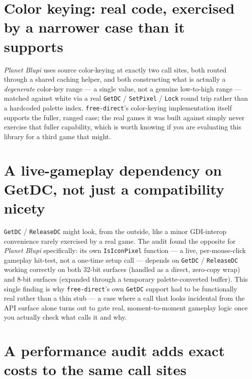 \section{Color keying: real code, exercised by a narrower case than it supports}

\emph{Planet Blupi} uses source color-keying at exactly two call sites, both routed through a
shared caching helper, and both constructing what is actually a \emph{degenerate} color-key
range --- a single value, not a genuine low-to-high range --- matched against white via a
real \texttt{GetDC} / \texttt{SetPixel} / \texttt{Lock} round trip rather than a hardcoded palette
index. \texttt{free-direct}'s color-keying implementation itself supports the fuller, ranged
case; the real games it was built against simply never exercise that fuller capability, which
is worth knowing if you are evaluating this library for a third game that might.

\section{A live-gameplay dependency on GetDC, not just a compatibility nicety}

\texttt{GetDC} / \texttt{ReleaseDC} might look, from the outside, like a minor GDI-interop
convenience rarely exercised by a real game. The audit found the opposite for
\emph{Planet Blupi} specifically: its own \texttt{IsIconPixel} function --- a live,
per-mouse-click gameplay hit-test, not a one-time setup call --- depends on
\texttt{GetDC} / \texttt{ReleaseDC} working correctly on both 32-bit surfaces (handled as a
direct, zero-copy wrap) and 8-bit surfaces (expanded through a temporary palette-converted
buffer). This single finding is why \texttt{free-direct}'s own \texttt{GetDC} support had to
be functionally real rather than a thin stub --- a case where a call that looks incidental
from the API surface alone turns out to gate real, moment-to-moment gameplay logic once you
actually check what calls it and why.

\section{A performance audit adds exact costs to the same call sites}

